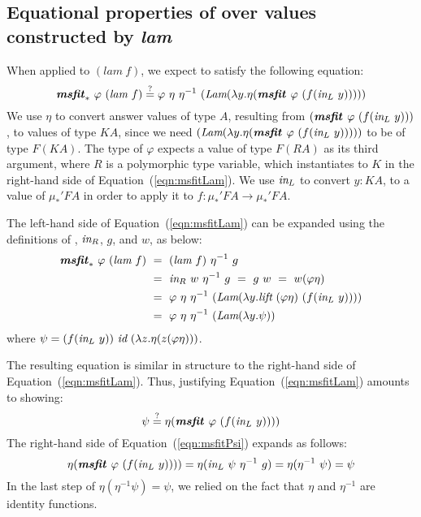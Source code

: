 \subsection{Equational properties of \msfit{*} over
	values constructed by \textit{lam}}
	\label{sec:theory:eqlam}
When applied to $(\textit{lam}~f)$, we expect \msfit{*} to
satisfy the following equation:\vspace*{-1ex}
\begin{equation}
\textbf{\textit{msfit}}_{*}~\varphi~(\textit{lam}~f)
\stackrel{?}{=} \varphi~\eta~\eta^{-1}
	~(\textit{Lam}(\lambda y.\eta(\textbf{\textit{msfit}}_{~}\varphi~(f(\textit{in}_{L}~y)))))
\label{eqn:msfitLam}
\end{equation}
We use $\eta$ to convert answer values of type $A$, resulting from
$(\textbf{\textit{msfit}}_{~}\varphi~(f(\textit{in}_{L}~y)))$, to values of type $KA$, since we need
$(\textit{Lam}(\lambda y.\eta(\textbf{\textit{msfit}}_{~}\varphi~(f(\textit{in}_{L}~y)))))$
to be of type $F(KA)$. The type of $\varphi$ expects a value of type $F(RA)$
as its third argument, where $R$ is a polymorphic type variable, which
instantiates to $K$ in the right-hand side of Equation~(\ref{eqn:msfitLam}).
We use $\textit{in}_{L}$ to convert $y : KA$, to a value of $\mu_{*}' F A$
in order to apply it to $f : \mu_{*}' F A \to \mu_{*}' F A$.

The left-hand side of Equation~(\ref{eqn:msfitLam}) can be expanded
using the definitions of \msfit{*}, $\textit{in}_{R}$, $g$, and $w$,
as below:\vspace*{-1ex}
\begin{align*}
\textbf{\textit{msfit}}_{*}~\varphi~(\textit{lam}~f)
&~=~ (\textit{lam}~f)~\eta^{-1}~g \\
&~=~ \textit{in}_{R}~w~\eta^{-1}~g ~=~ g~w ~=~ w(\varphi\eta) \\
&~=~ \varphi~\eta~\eta^{-1}~
	(\textit{Lam}(\lambda y.\textit{lift}~(\varphi\eta)~(f(\textit{in}_{L}~y)))) \\
&~=~ \varphi~\eta~\eta^{-1}~(\textit{Lam}(\lambda y.\psi))
\end{align*}
where $\psi = (f(\textit{in}_{L}~y))~\textit{id}~(\lambda z.\eta(z(\varphi\eta)))$.

The resulting equation is similar in structure to the right-hand side of
Equation~(\ref{eqn:msfitLam}). Thus, justifying Equation~(\ref{eqn:msfitLam})
amounts to showing:\vspace*{-1ex}
\begin{equation}
\psi \stackrel{?}{=} \eta(\textbf{\textit{msfit}}_{~}\varphi~(f(\textit{in}_{L}~y))))
\label{eqn:msfitPsi}
\end{equation}
The right-hand side of Equation~(\ref{eqn:msfitPsi}) expands as follows:\vspace*{-1ex}
\[ \eta(\textbf{\textit{msfit}}_{~}\varphi~(f(\textit{in}_{L}~y)))) = \eta(\textit{in}_{L}~\psi~\eta^{-1}~g)
	= \eta(\eta^{-1}~\psi) = \psi
\]
In the last step of $\eta(\eta^{-1}\psi)=\psi$, we relied on the fact that
$\eta$ and $\eta^{-1}$ are identity functions.

